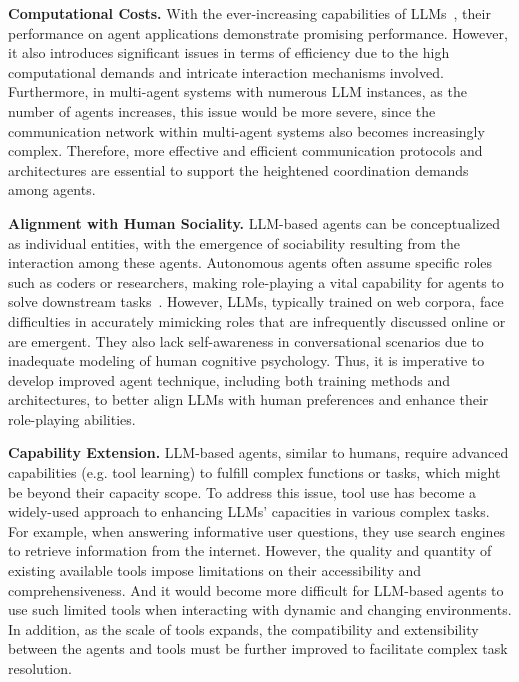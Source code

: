 \textbf{Computational Costs.} With the ever-increasing capabilities of LLMs~\cite{wang-arxiv-2023-a}, their performance on agent applications demonstrate promising performance. However, it also introduces significant issues in terms of efficiency due to the high computational demands and intricate interaction mechanisms involved. Furthermore, in multi-agent systems with numerous LLM instances, as the number of agents increases, this issue would be  more severe, since the communication network within multi-agent systems also becomes increasingly complex. Therefore, more effective and efficient communication protocols and architectures are essential to support the heightened coordination demands among agents.

\textbf{{Alignment with Human Sociality.}} LLM-based agents can be conceptualized as individual entities, with the emergence of sociability resulting from the interaction among these agents. Autonomous agents often assume specific roles such as coders or researchers, making role-playing a vital capability for agents to solve downstream tasks~\cite{Shao-Character-LLM-2023-arxiv}. However, LLMs, typically trained on web corpora, face difficulties in accurately mimicking roles that are infrequently discussed online or are emergent. They also lack self-awareness in conversational scenarios due to inadequate modeling of human cognitive psychology. Thus, it is imperative to develop improved agent technique, including both training methods and architectures, to better align LLMs with human preferences and enhance their role-playing abilities.

\textbf{Capability Extension.} LLM-based agents, similar to humans, require advanced capabilities (e.g. tool learning) to fulfill complex functions or tasks, which might be beyond their capacity scope. To address this issue, tool use has become a widely-used approach to enhancing LLMs' capacities in various complex tasks. For example, when answering informative user questions, they use search engines to retrieve information from the internet. {However, the quality and quantity of existing available tools impose limitations on their accessibility and comprehensiveness. And it would become more difficult for LLM-based agents to use such limited tools when interacting with dynamic and changing environments}.  In addition, as the scale of tools expands, the compatibility and extensibility between the agents and tools must be further improved to facilitate complex task resolution.

